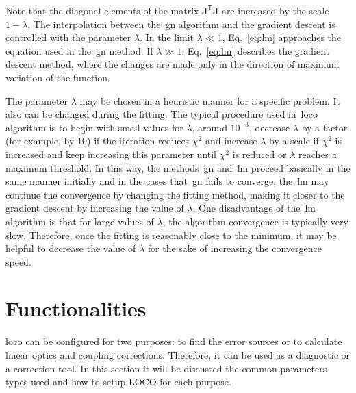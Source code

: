 Note that the diagonal elements of the matrix $\mathbf{J}^{\mathsf{T}}\mathbf{J}$ are increased by the scale $1 + \lambda$. The interpolation between the~\gls{gn} algorithm and the gradient descent is controlled with the parameter $\lambda$. In the limit $\lambda \ll 1$, Eq.~\eqref{eq:lm} approaches the equation used in the~\gls{gn} method. If $\lambda \gg 1$, Eq.~\eqref{eq:lm} describes the gradient descent method, where the changes are made only in the direction of maximum variation of the function.

The parameter $\lambda$ may be chosen in a heuristic manner for a specific problem. It also can be changed during the fitting. The typical procedure used in~\gls{loco} algorithm \cite{icfa_huang, huang2019beam} is to begin with small values for $\lambda$, around $10^{-3}$, decrease $\lambda$ by a factor (for example, by 10) if the iteration reduces $\chi^2$ and increase $\lambda$ by a scale if $\chi^2$ is increased and keep increasing this parameter until $\chi^2$ is reduced or $\lambda$ reaches a maximum threshold. In this way, the methods~\gls{gn} and~\gls{lm} proceed basically in the same manner initially and in the cases that~\gls{gn} fails to converge, the~\gls{lm} may continue the convergence by changing the fitting method, making it closer to the gradient descent by increasing the value of $\lambda$. One disadvantage of the~\gls{lm} algorithm is that for large values of $\lambda$, the algorithm convergence is typically very slow. Therefore, once the fitting is reasonably close to the minimum, it may be helpful to decrease the value of $\lambda$ for the sake of increasing the convergence speed.
\section{Functionalities}
\gls{loco} can be configured for two purposes: to find the error sources or to calculate linear optics and coupling corrections. Therefore, it can be used as a diagnostic or a correction tool. In this section it will be discussed the common parameters types used and how to setup LOCO for each purpose.
